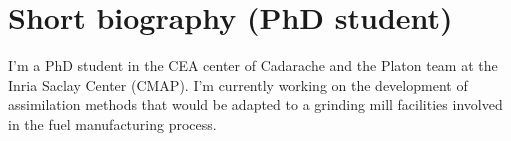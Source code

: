 \documentclass[a4paper,10pt,oneside]{article}
\begin{document}
\section*{Short biography (PhD student)}

I'm a PhD student in the CEA center of Cadarache and the Platon team at the Inria Saclay Center (CMAP). I'm currently working on the development of assimilation methods that would be adapted to a grinding mill facilities involved in the fuel manufacturing process.



\end{document}
